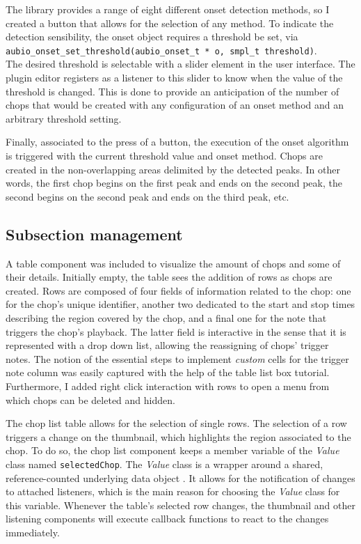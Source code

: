 \documentclass[12pt, a4paper, hidelinks]{article}
\begin{document}
	The library provides a range of eight different onset detection methods, so I created a button that allows for the selection of any method. To indicate the detection sensibility, the onset object requires a threshold be set, via\\
	\texttt{aubio\_onset\_set\_threshold(aubio\_onset\_t * o, smpl\_t threshold)}.\\
	The desired threshold is selectable with a slider element in the user interface. The plugin editor registers as a listener to this slider to know when the value of the threshold is changed. This is done to provide an anticipation of the number of chops that would be created with any configuration of an onset method and an arbitrary threshold setting. \par
	
	Finally, associated to the press of a button, the execution of the onset algorithm is triggered with the current threshold value and onset method. Chops are created in the non-overlapping areas delimited by the detected peaks. In other words, the first chop begins on the first peak and ends on the second peak, the second begins on the second peak and ends on the third peak, etc.
	
	
	\subsection{Subsection management}
    A table component was included to visualize the amount of chops and some of their details. Initially empty, the table sees the addition of rows as chops are created. Rows are composed of four fields of information related to the chop: one for the chop's unique identifier, another two dedicated to the start and stop times describing the region covered by the chop, and a final one for the note that triggers the chop's playback.
    The latter field is interactive in the sense that it is represented with a drop down list, allowing the reassigning of chops' trigger notes. The notion of the essential steps to implement \textit{custom} cells for the trigger note column was easily captured with the help of the table list box tutorial\cite{tablelistbox}. Furthermore, I added right click interaction with rows to open a menu from which chops can be deleted and hidden.\par %
    
	The chop list table allows for the selection of single rows. The selection of a row triggers a change on the thumbnail, which highlights the region associated to the chop. To do so, the chop list component keeps a member variable of the \textit{Value} class named \texttt{selectedChop}. The \textit{Value} class is a wrapper around a shared, reference-counted underlying data object \cite{value}. It allows for the notification of changes to attached listeners, which is the main reason for choosing the \textit{Value} class for this variable. Whenever the table's selected row changes, the thumbnail and other listening components will execute callback functions to react to the changes immediately. \par
	
\end{document}
